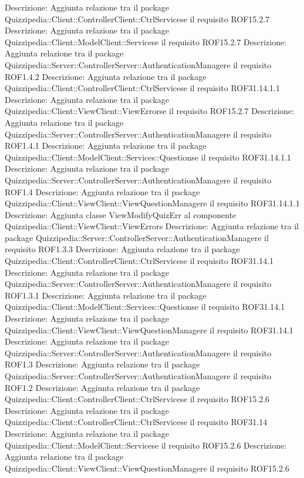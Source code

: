 Descrizione: Aggiunta relazione tra il package Quizzipedia::Client::ControllerClient::CtrlServicese il requisito ROF15.2.7 
Descrizione: Aggiunta relazione tra il package Quizzipedia::Client::ModelClient::Servicese il requisito ROF15.2.7 
Descrizione: Aggiunta relazione tra il package Quizzipedia::Server::ControllerServer::AuthenticationManagere il requisito ROF1.4.2 
Descrizione: Aggiunta relazione tra il package Quizzipedia::Client::ControllerClient::CtrlServicese il requisito ROF31.14.1.1 
Descrizione: Aggiunta relazione tra il package Quizzipedia::Client::ViewClient::ViewErrorse il requisito ROF15.2.7 
Descrizione: Aggiunta relazione tra il package Quizzipedia::Server::ControllerServer::AuthenticationManagere il requisito ROF1.4.1 
Descrizione: Aggiunta relazione tra il package Quizzipedia::Client::ModelClient::Services::Questionse il requisito ROF31.14.1.1 
Descrizione: Aggiunta relazione tra il package Quizzipedia::Server::ControllerServer::AuthenticationManagere il requisito ROF1.4 
Descrizione: Aggiunta relazione tra il package Quizzipedia::Client::ViewClient::ViewQuestionManagere il requisito ROF31.14.1.1 
Descrizione: Aggiunta classe ViewModifyQuizErr al componente Quizzipedia::Client::ViewClient::ViewErrors 
Descrizione: Aggiunta relazione tra il package Quizzipedia::Server::ControllerServer::AuthenticationManagere il requisito ROF1.3.3 
Descrizione: Aggiunta relazione tra il package Quizzipedia::Client::ControllerClient::CtrlServicese il requisito ROF31.14.1 
Descrizione: Aggiunta relazione tra il package Quizzipedia::Server::ControllerServer::AuthenticationManagere il requisito ROF1.3.1 
Descrizione: Aggiunta relazione tra il package Quizzipedia::Client::ModelClient::Services::Questionse il requisito ROF31.14.1 
Descrizione: Aggiunta relazione tra il package Quizzipedia::Client::ViewClient::ViewQuestionManagere il requisito ROF31.14.1 
Descrizione: Aggiunta relazione tra il package Quizzipedia::Server::ControllerServer::AuthenticationManagere il requisito ROF1.3 
Descrizione: Aggiunta relazione tra il package Quizzipedia::Server::ControllerServer::AuthenticationManagere il requisito ROF1.2 
Descrizione: Aggiunta relazione tra il package Quizzipedia::Client::ControllerClient::CtrlServicese il requisito ROF15.2.6 
Descrizione: Aggiunta relazione tra il package Quizzipedia::Client::ControllerClient::CtrlServicese il requisito ROF31.14 
Descrizione: Aggiunta relazione tra il package Quizzipedia::Client::ModelClient::Servicese il requisito ROF15.2.6 
Descrizione: Aggiunta relazione tra il package Quizzipedia::Client::ViewClient::ViewQuestionManagere il requisito ROF15.2.6 
